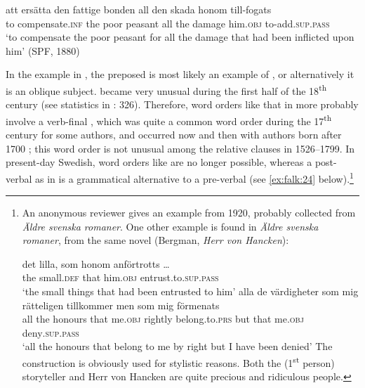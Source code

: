 \documentclass[output=paper]{langscibook}
\begin{document}
\ex\label{ex:falk:22d}
\gll att    ersätta        den  fattige  bonden    all  den  skada    honom till-fogats\\
      to    compensate.\textsc{inf}  the  poor    peasant  all  the  damage  him.\textsc{obj}         to-add\textsc{.sup.pass}\\
\glt ‘to compensate the poor peasant for all the damage that had been inflicted upon       him’ (SPF, 1880)
\z
\z

In the  example in , the preposed  is most likely an example of , or alternatively it is an oblique subject.  became very unusual during the first half of the 18\textsuperscript{th} century (see statistics in \citealt{Falk1993}: 326). Therefore, word orders like that in  more probably involve a verb-final , which was quite a common word order during the 17\textsuperscript{th} century for some authors, and occurred now and then with authors born after 1700 \citep{Platzack1983}; this word order is not unusual among the relative clauses in 1526–1799. In present-day Swedish, word orders like  are no longer possible, whereas a post-verbal  as in  is a grammatical alternative to a pre-verbal  (see \ref{ex:falk:24} below).\footnote{An anonymous reviewer gives an example from 1920, probably collected from \textit{Äldre svenska romaner}. One other example is found in \textit{Äldre svenska romaner}, from the same novel (Bergman, \textit{Herr von Hancken}):

\ea \gll det  lilla,    som  honom    anförtrotts …\\
        the  small.\textsc{def}  that  him.\textsc{obj}  entrust.to.\textsc{sup.pass}\\
        \glt  ‘the small things that had been entrusted to him’
\ex  \gll alla de  värdigheter  som  mig    rätteligen  tillkommer    men  som  mig    förmenats\\
         all the  honours    that  me.\textsc{obj}  rightly    belong.to.\textsc{prs}  but  that  me.\textsc{obj}  deny\textsc{.sup.pass}\\
       \glt ‘all the honours that belong to me by right but I have been denied’
\z The construction is obviously used for stylistic reasons. Both the (1\textsuperscript{st} person) storyteller and Herr von Hancken are quite precious and ridiculous people.}
\end{document}
